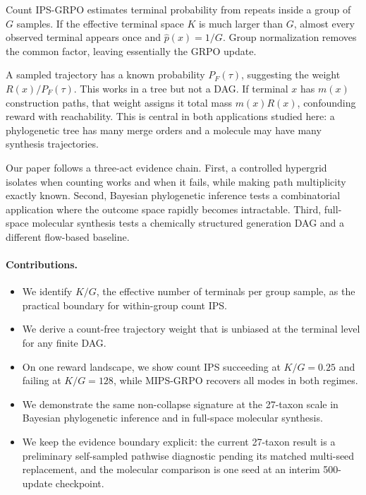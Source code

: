 \documentclass[11pt]{article}
\begin{document}
Count IPS-GRPO estimates terminal probability from repeats inside a group of
\(G\) samples. If the effective terminal space \(K\) is much larger than
\(G\), almost every observed terminal appears once and \(\hat p(x)=1/G\).
Group normalization removes the common factor, leaving essentially the GRPO
update.

A sampled trajectory has a known probability \(P_F(\tau)\), suggesting the
weight \(R(x)/P_F(\tau)\). This works in a tree but not a DAG. If terminal
\(x\) has \(m(x)\) construction paths, that weight assigns it total mass
\(m(x)R(x)\), confounding reward with reachability. This is central in both
applications studied here: a phylogenetic tree has many merge orders and a
molecule may have many synthesis trajectories.

Our paper follows a three-act evidence chain. First, a controlled hypergrid
isolates when counting works and when it fails, while making path multiplicity
exactly known. Second, Bayesian phylogenetic inference tests a combinatorial
application where the outcome space rapidly becomes intractable. Third,
full-space molecular synthesis tests a chemically structured generation DAG
and a different flow-based baseline.

\paragraph{Contributions.}
\begin{itemize}
 \item We identify \(K/G\), the effective number of terminals per group
 sample, as the practical boundary for within-group count IPS.
 \item We derive a count-free trajectory weight that is unbiased at the
 terminal level for any finite DAG.
 \item On one reward landscape, we show count IPS succeeding at
 \(K/G=0.25\) and failing at \(K/G=128\), while MIPS-GRPO recovers all modes
 in both regimes.
 \item We demonstrate the same non-collapse signature at the 27-taxon scale in
 Bayesian phylogenetic inference and in full-space molecular synthesis.
 \item We keep the evidence boundary explicit: the current 27-taxon result is
 a preliminary self-sampled pathwise diagnostic pending its matched multi-seed
 replacement, and the molecular comparison is one seed at an interim
 500-update checkpoint.
\end{itemize}
\end{document}
